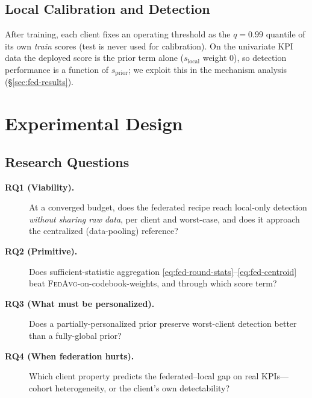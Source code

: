 \subsection{Local Calibration and Detection}
\label{sec:fed-detect}
After training, each client fixes an operating threshold as the $q{=}0.99$ quantile of its
own \emph{train} scores (test is never used for calibration). On the univariate KPI data
the deployed score is the prior term alone ($s_{\mathrm{local}}$ weight $0$), so detection
performance is a function of $s_{\mathrm{prior}}$; we exploit this in the mechanism
analysis (\S\ref{sec:fed-results}).

\section{Experimental Design}
\label{sec:fed-experiments}

\subsection{Research Questions}
\begin{description}
  \item[\textbf{RQ1 (Viability).}] At a converged budget, does the federated recipe reach
  local-only detection \emph{without sharing raw data}, per client and worst-case, and does
  it approach the centralized (data-pooling) reference?
  \item[\textbf{RQ2 (Primitive).}] Does sufficient-statistic aggregation
  \eqref{eq:fed-round-stats}--\eqref{eq:fed-centroid} beat \textsc{FedAvg}-on-codebook-weights,
  and through which score term?
  \item[\textbf{RQ3 (What must be personalized).}] Does a partially-personalized prior
  preserve worst-client detection better than a fully-global prior?
  \item[\textbf{RQ4 (When federation hurts).}] Which client property predicts the
  federated--local gap on real KPIs---cohort heterogeneity, or the client's own
  detectability?
\end{description}

